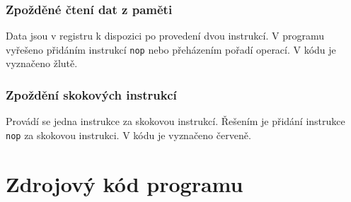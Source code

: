 \documentclass[11pt, titlepage]{article}
\begin{document}
\subsubsection{Zpožděné čtení dat z paměti}

Data jsou v registru k dispozici po provedení dvou instrukcí. V programu vyřešeno přidáním instrukcí \texttt{nop} nebo přeházením pořadí operací. V kódu je vyznačeno žlutě.

\subsubsection{Zpoždění skokových instrukcí}

Provádí se jedna instrukce za skokovou instrukcí. Řešením je přidání instrukce \texttt{nop} za skokovou instrukci. V kódu je vyznačeno červeně.

\section{Zdrojový kód programu}
\end{document}
